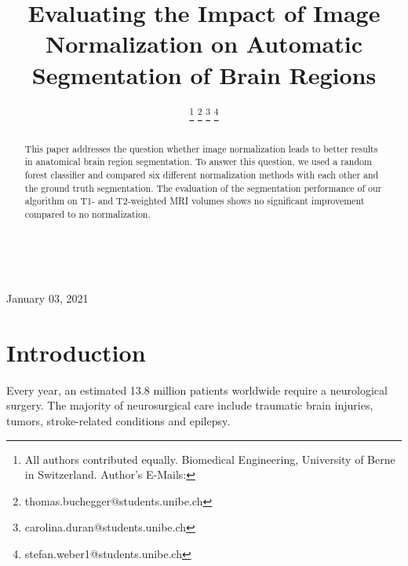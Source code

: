 \documentclass[article]{IEEEtran}
\begin{document}

\title{Evaluating the Impact of Image Normalization on Automatic Segmentation of Brain Regions}

\author{ 
\and {} 
\and {} 
\thanks{All authors contributed equally. Biomedical Engineering, University of Berne in Switzerland. Author's E-Mails:}%
\thanks{thomas.buchegger@students.unibe.ch}%
\thanks{carolina.duran@students.unibe.ch}%
\thanks{stefan.weber1@students.unibe.ch}}

\\
\maketitle
\newpage



\begin{abstract}
	This paper addresses the question whether image normalization leads to better results in anatomical brain region segmentation. 
	To answer this question, we used a random forest classifier and compared six different normalization methods with each other and the ground truth segmentation. 
	The evaluation of the segmentation performance of our algorithm on T1- and T2-weighted MRI volumes shows no significant improvement compared to no normalization. 
\end{abstract}
\hfill January 03, 2021


\section{Introduction}

	Every year, an estimated 13.8 million patients worldwide require a neurological surgery. The majority of neurosurgical care include traumatic brain injuries, tumors, stroke-related conditions and epilepsy. \cite{Dewan2019}
	
\end{document}
